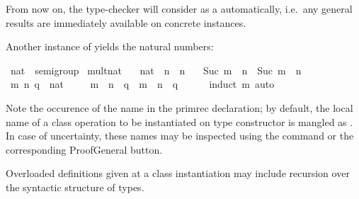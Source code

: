 \begin{isabellebody}
\begin{isamarkuptext}
  From now on, the type-checker will consider 
  as a  automatically, i.e.\ any general results
  are immediately available on concrete instances.

  \medskip Another instance of  yields the natural numbers:%
\end{isamarkuptext}%
\isamarkuptrue%
%
\isadelimquote
%
\endisadelimquote
%
\isatagquote
{}\isamarkupfalse%
\ nat\ {\isacharcolon}{\isacharcolon}\ semigroup\isanewline
{}\isanewline
\isanewline
{}\isamarkupfalse%
\ mult{\isacharunderscore}nat\ \isanewline
\ \ {\isachardoublequoteopen}{\isacharparenleft}{}{\isasymColon}nat{\isacharparenright}\ {\isasymotimes}\ n\ {\isacharequal}\ n{\isachardoublequoteclose}\isanewline
\ \ {\isacharbar}\ {\isachardoublequoteopen}Suc\ m\ {\isasymotimes}\ n\ {\isacharequal}\ Suc\ {\isacharparenleft}m\ {\isasymotimes}\ n{\isacharparenright}{\isachardoublequoteclose}\isanewline
\isanewline
{}\isamarkupfalse%
\ \isamarkupfalse%
\isanewline
\ \ \isamarkupfalse%
\ m\ n\ q\ {\isacharcolon}{\isacharcolon}\ nat\ \isanewline
\ \ \isamarkupfalse%
\ {\isachardoublequoteopen}m\ {\isasymotimes}\ n\ {\isasymotimes}\ q\ {\isacharequal}\ m\ {\isasymotimes}\ {\isacharparenleft}n\ {\isasymotimes}\ q{\isacharparenright}{\isachardoublequoteclose}\isanewline
\ \ \ \ \isamarkupfalse%
\ {\isacharparenleft}induct\ m{\isacharparenright}\ auto\isanewline
{}\isamarkupfalse%
\isanewline
\isanewline
{}\isamarkupfalse%
%
\endisatagquote
{\isafoldquote}%
%
\isadelimquote
%
\endisadelimquote
%
\begin{isamarkuptext}%
\noindent Note the occurence of the name 
  in the primrec declaration;  by default, the local name of
  a class operation  to be instantiated on type constructor
  \isa{{\isasymkappa}} is mangled as .  In case of uncertainty,
  these names may be inspected using the \hyperlink{command.print-context}{\mbox{}} command
  or the corresponding ProofGeneral button.%
\end{isamarkuptext}%
\isamarkuptrue%
%
\isamarkuptrue%
%
\begin{isamarkuptext}%
Overloaded definitions given at a class instantiation
  may include recursion over the syntactic structure of types.

\end{isamarkuptext}
\end{isabellebody}
